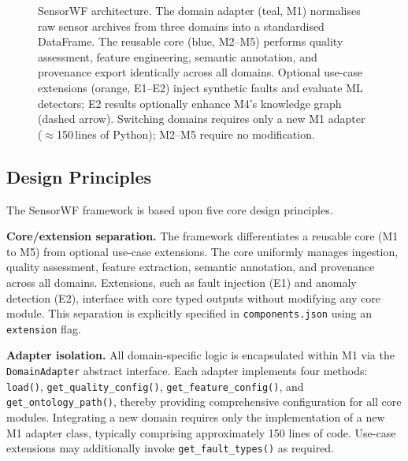 \documentclass[conference]{IEEEtran}
\begin{document}
\begin{figure}[t]
\caption{SensorWF architecture. The domain adapter (teal, M1) normalises raw sensor archives from three domains into a standardised DataFrame. The reusable core (blue, M2--M5) performs quality assessment, feature engineering, semantic annotation, and provenance export identically across all domains. Optional use-case extensions (orange, E1--E2) inject synthetic faults and evaluate ML detectors; E2 results optionally enhance M4's knowledge graph (dashed arrow). Switching domains requires only a new M1 adapter ($\approx$150\,lines of Python); M2--M5 require no modification.}
\label{fig:architecture}
\end{figure}

\subsection{Design Principles}

The SensorWF framework is based upon five core design principles.

\textbf{Core/extension separation.} The framework differentiates a reusable core (M1 to M5) from optional use-case extensions. The core uniformly manages ingestion, quality assessment, feature extraction, semantic annotation, and provenance across all domains. Extensions, such as fault injection (E1) and anomaly detection (E2), interface with core typed outputs without modifying any core module. This separation is explicitly specified in \texttt{components.json} using an \texttt{extension} flag.

\textbf{Adapter isolation.} All domain-specific logic is encapsulated within M1 via the \texttt{DomainAdapter} abstract interface. Each adapter implements four methods: \texttt{load()}, \texttt{get\_quality\_config()}, \texttt{get\_feature\_config()}, and \texttt{get\_ontology\_path()}, thereby providing comprehensive configuration for all core modules. Integrating a new domain requires only the implementation of a new M1 adapter class, typically comprising approximately 150 lines of code. Use-case extensions may additionally invoke \texttt{get\_fault\_types()} as required.
\end{document}
